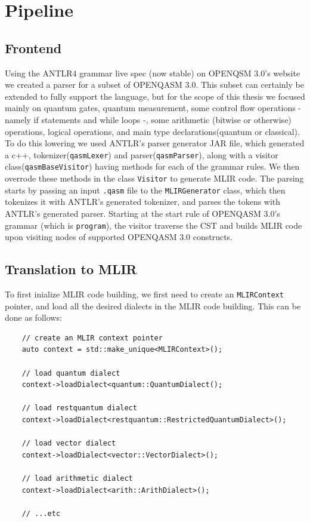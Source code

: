 \section{Pipeline}
\subsection{Frontend}
Using the ANTLR4 grammar live spec (now stable) on OPENQSM 3.0's website we
created a parser for a subset of OPENQASM 3.0. This subset can certainly be
extended to fully support the language, but for the scope of this thesis we
focused mainly on quantum gates, quantum measurement, some control flow
operations - namely if statements and while loops -, some arithmetic (bitwise or
otherwise) operations, logical operations, and main type declarations(quantum or
classical). To do this lowering we used ANTLR's parser generator JAR file, which
generated a c++, tokenizer(\texttt{qasmLexer}) and parser(\texttt{qasmParser}),
along with a visitor class(\texttt{qasmBaseVisitor}) having methods for each of
the grammar rules. We then overrode these methods in the class \texttt{Visitor}
to generate MLIR code. The parsing starts by passing an input \texttt{.qasm}
file to the \texttt{MLIRGenerator} class, which then tokenizes it with ANTLR's
generated tokenizer, and parses the tokens with ANTLR's generated parser.
Starting at the start rule of OPENQASM 3.0's grammar (which is
\texttt{program}), the visitor traverse the CST and builds MLIR code upon
visiting nodes of supported OPENQASM 3.0 constructs.
\subsection{Translation to MLIR}
To first inialize MLIR code building, we first need to create an
\texttt{MLIRContext} pointer, and load all the desired dialects in the MLIR code
building. This can be done as follows:
\begin{verbatim}
    // create an MLIR context pointer 
    auto context = std::make_unique<MLIRContext>();

    // load quantum dialect 
    context->loadDialect<quantum::QuantumDialect();

    // load restquantum dialect
    context->loadDialect<restquantum::RestrictedQuantumDialect>();
    
    // load vector dialect
    context->loadDialect<vector::VectorDialect>();

    // load arithmetic dialect 
    context->loadDialect<arith::ArithDialect>();

    // ...etc
\end{verbatim}

